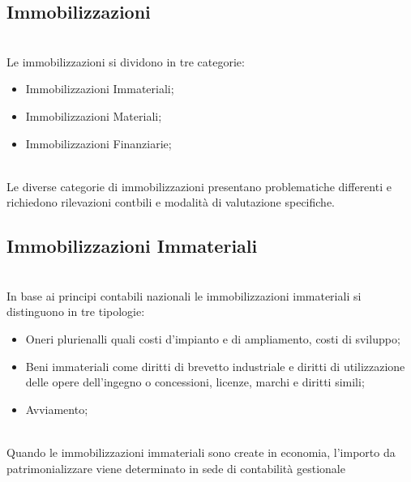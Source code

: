 \documentclass{report}
\begin{document}
\subsection{Immobilizzazioni} %
\label{sub:Immobilizzazioni}
\\
Le immobilizzazioni si dividono in tre categorie: 
\begin{itemize}
  \item{Immobilizzazioni Immateriali;}
  \item{Immobilizzazioni Materiali;}
  \item{Immobilizzazioni Finanziarie;}
\end{itemize}
\\
Le diverse categorie di immobilizzazioni presentano problematiche differenti e richiedono rilevazioni contbili e modalità di valutazione specifiche.

\subsection{Immobilizzazioni Immateriali} %
\label{sec:Immobilizzazioni Immateriali}

\\
In base ai principi contabili nazionali le immobilizzazioni immateriali si distinguono in tre tipologie:
\\
\begin{itemize}
  \item{Oneri plurienalli quali costi d'impianto e di ampliamento, costi di sviluppo;}
  \item{Beni immateriali come diritti di brevetto industriale e diritti di utilizzazione delle opere dell'ingegno o concessioni, licenze, marchi e diritti simili;}
  \item{Avviamento;}
\end{itemize}
\\
Quando le immobilizzazioni immateriali sono create in economia, l'importo da patrimonializzare viene determinato in sede di contabilità gestionale
\end{document}

